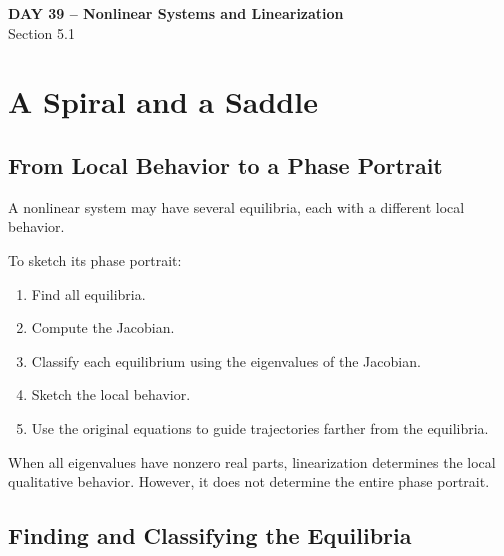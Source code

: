 \documentclass[10pt,letterpaper]{article}
\begin{document}
\begin{center}
\Large\textbf{DAY 39 -- Nonlinear Systems and Linearization}\\
\normalsize Section 5.1
\end{center}

\section{A Spiral and a Saddle}

\subsection{From Local Behavior to a Phase Portrait}

A nonlinear system may have several equilibria,
each with a different local behavior.

To sketch its phase portrait:
\begin{enumerate}
    \item Find all equilibria.
    \item Compute the Jacobian.
    \item Classify each equilibrium using the
    eigenvalues of the Jacobian.
    \item Sketch the local behavior.
    \item Use the original equations to guide
    trajectories farther from the equilibria.
\end{enumerate}

When all eigenvalues have nonzero real parts,
linearization determines the local qualitative
behavior. However, it does not determine the
entire phase portrait.

\subsection{Finding and Classifying the Equilibria}
\end{document}
